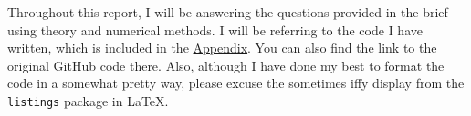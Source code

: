 \documentclass[../main.tex]{subfiles}
\begin{document}
    Throughout this report, I will be answering the questions provided in the brief using theory and numerical methods.
    I will be referring to the code I have written, which is included in the \hyperref[ch:appendix]{Appendix}.
    You can also find the link to the original GitHub code there.
    Also, although I have done my best to format the code in a somewhat pretty way, please excuse
    the sometimes iffy display from the \texttt{listings} package in \LaTeX.
\end{document}
